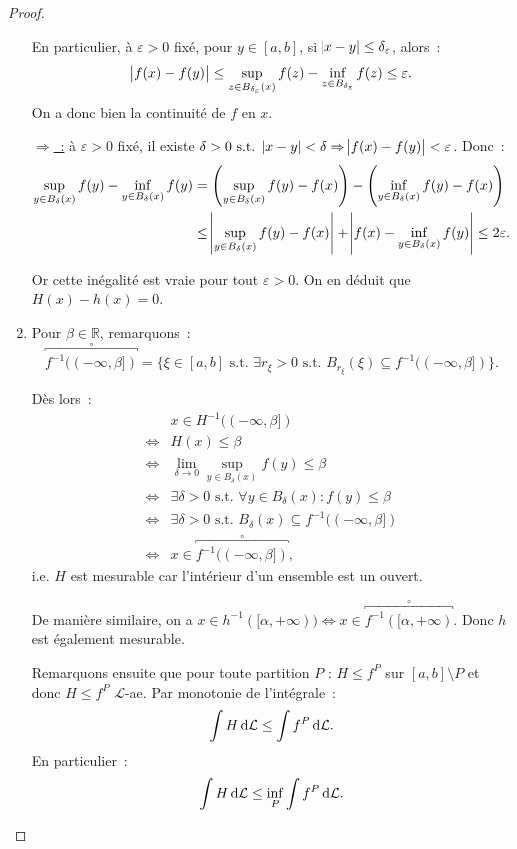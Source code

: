 \documentclass{article}
\newcommand{\pinfty}{{+\infty}}
\newcommand{\minfty}{{-\infty}}
\newcommand{\st}{\text{ s.t. }}
\newcommand{\R}{{\mathbb R}}
\begin{document}
\begin{proof}
\begin{enumerate}
	En particulier, à $\varepsilon > 0$ fixé, pour $y \in [a, b]$, si $\abs {x-y} \leq \delta_\varepsilon$, alors~:
	\[\abs {f(x)-f(y)} \leq \sup_{z \in B_{\delta_\varepsilon}(x)}f(z) - \inf_{z \in B_{\delta_\varepsilon}}f(z) \leq \varepsilon.\]
	On a donc bien la continuité de $f$ en $x$.

	\underline {$\Rightarrow$~:} à $\varepsilon > 0$ fixé, il existe $\delta > 0 \st \abs {x-y} < \delta \Rightarrow \abs {f(x)-f(y)} < \varepsilon$. Donc~:
	\begin{align*}
		\sup_{y \in B_\delta(x)}f(y) - \inf_{y \in B_\delta(x)}f(y) &= \left(\sup_{y \in B_\delta(x)}f(y) - f(x)\right) - \left(\inf_{y \in B_\delta(x)}f(y) - f(x)\right) \\
		&\leq \abs {\sup_{y \in B_\delta(x)}f(y)-f(x)} + \abs {f(x)-\inf_{y \in B_\delta(x)}f(y)} \leq 2\varepsilon.
	\end{align*}

	Or cette inégalité est vraie pour tout $\varepsilon > 0$. On en déduit que $H(x)-h(x) = 0$.

	\item Pour $\beta \in \R$, remarquons~:
	\[\overbracket {f^{-1}((\minfty, \beta])}^{\circ} = \{\xi \in [a, b] \st \exists r_\xi > 0 \st B_{r_\xi}(\xi) \subseteq f^{-1}((\minfty, \beta])\}.\]

	Dès lors~:
	\begin{align*}
	     & x \in H^{-1}((\minfty, \beta]) \\
	\iff & H(x) \leq \beta  \\
	\iff & \lim_{\delta \to 0}\sup_{y \in B_\delta(x)}f(y) \leq \beta \\
	\iff & \exists \delta > 0 \st \forall y \in B_\delta(x) : f(y) \leq \beta \\
	\iff & \exists \delta > 0 \st B_\delta(x) \subseteq f^{-1}((\minfty, \beta]) \\
	\iff & x \in \overbracket {f^{-1}((\minfty, \beta])}^{\circ},
	\end{align*}
	i.e. $H$ est mesurable car l'intérieur d'un ensemble est un ouvert.

	De manière similaire, on a $x \in h^{-1}([\alpha, \pinfty)) \iff x \in \overbracket {f^{-1}([\alpha, \pinfty)}^{\circ}$. Donc $h$ est également mesurable.

	Remarquons ensuite que pour toute partition $P$ : $H \leq f^P$ sur $[a, b] \setminus P$ et donc $H \leq f^P$ $\mathcal L$-ae. Par monotonie de l'intégrale~:
	\[\int H\dif\mathcal L \leq \int f^P\dif\mathcal L.\]
	En particulier~:
	\[\int H\dif \mathcal L \leq \inf_P\int f^P\dif\mathcal L.\]


\end{enumerate}
\end{proof}
\end{document}
